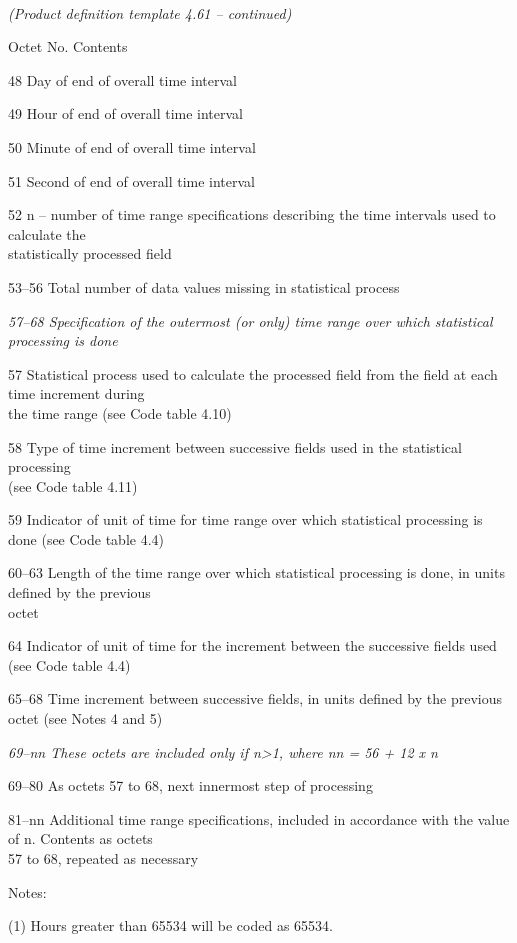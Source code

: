 \emph{\\
(Product definition template 4.61 -- continued)}

Octet No. Contents

48 Day of end of overall time interval

49 Hour of end of overall time interval

50 Minute of end of overall time interval

51 Second of end of overall time interval

52 n -- number of time range specifications describing the time intervals used to calculate the\\
statistically processed field

53--56 Total number of data values missing in statistical process

\emph{57--68 Specification of the outermost (or only) time range over which statistical processing is done}

57 Statistical process used to calculate the processed field from the field at each time increment during\\
the time range (see Code table 4.10)

58 Type of time increment between successive fields used in the statistical processing\\
(see Code table 4.11)

59 Indicator of unit of time for time range over which statistical processing is done (see Code table 4.4)

60--63 Length of the time range over which statistical processing is done, in units defined by the previous\\
octet

64 Indicator of unit of time for the increment between the successive fields used (see Code table 4.4)

65--68 Time increment between successive fields, in units defined by the previous octet (see Notes 4 and 5)

\emph{69--nn These octets are included only if n\textgreater1, where nn = 56 + 12 x n}

69--80 As octets 57 to 68, next innermost step of processing

81--nn Additional time range specifications, included in accordance with the value of n. Contents as octets\\
57 to 68, repeated as necessary

Notes:

(1) Hours greater than 65534 will be coded as 65534.

